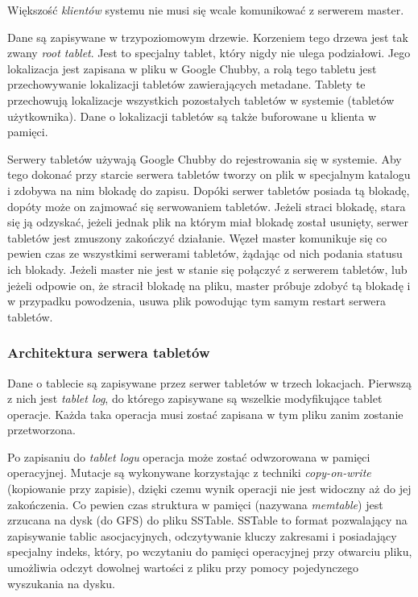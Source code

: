 Większość \emph{klientów} systemu nie musi się wcale komunikować z serwerem master.

Dane są zapisywane w trzypoziomowym drzewie.
Korzeniem tego drzewa jest tak zwany \emph{root tablet}.
Jest to specjalny tablet, który nigdy nie ulega podziałowi.
Jego lokalizacja jest zapisana w pliku w Google Chubby, a rolą tego tabletu jest przechowywanie lokalizacji tabletów zawierających metadane.
Tablety te przechowują lokalizacje wszystkich pozostałych tabletów w systemie (tabletów użytkownika).
Dane o lokalizacji tabletów są także buforowane u klienta w pamięci.

Serwery tabletów używają Google Chubby do rejestrowania się w systemie.
Aby tego dokonać przy starcie serwera tabletów tworzy on plik w specjalnym katalogu i zdobywa na nim blokadę do zapisu.
Dopóki serwer tabletów posiada tą blokadę, dopóty może on zajmować się serwowaniem tabletów.
Jeżeli straci blokadę, stara się ją odzyskać, jeżeli jednak plik na którym miał blokadę został usunięty, serwer tabletów jest zmuszony zakończyć działanie.
Węzeł master komunikuje się co pewien czas ze wszystkimi serwerami tabletów, żądając od nich podania statusu ich blokady.
Jeżeli master nie jest w stanie się połączyć z serwerem tabletów, lub jeżeli odpowie on, że stracił blokadę na pliku, master próbuje zdobyć tą blokadę i w przypadku powodzenia, usuwa plik powodując tym samym restart serwera tabletów.

\subsubsection*{Architektura serwera tabletów}

Dane o tablecie są zapisywane przez serwer tabletów w trzech lokacjach.
Pierwszą z nich jest \emph{tablet log}, do którego zapisywane są wszelkie modyfikujące tablet operacje.
Każda taka operacja musi zostać zapisana w tym pliku zanim zostanie przetworzona.

Po zapisaniu do \emph{tablet logu} operacja może zostać odwzorowana w pamięci operacyjnej.
Mutacje są wykonywane korzystając z techniki \emph{copy-on-write} (kopiowanie przy zapisie), dzięki czemu wynik operacji nie jest widoczny aż do jej zakończenia.
Co pewien czas struktura w pamięci (nazywana \emph{memtable}) jest zrzucana na dysk (do GFS) do pliku SSTable.
SSTable to format pozwalający na zapisywanie tablic asocjacyjnych, odczytywanie kluczy zakresami i posiadający specjalny indeks, który, po wczytaniu do pamięci operacyjnej przy otwarciu pliku, umożliwia odczyt dowolnej wartości z pliku przy pomocy pojedynczego wyszukania na dysku.

